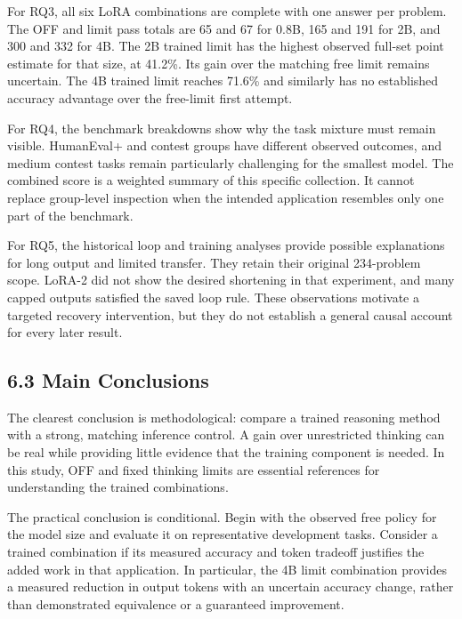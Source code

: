 \documentclass[11pt,letterpaper]{article}
\begin{document}
For RQ3, all six LoRA combinations are complete with one answer per problem. The OFF and limit pass totals are 65 and 67 for 0.8B, 165 and 191 for 2B, and 300 and 332 for 4B. The 2B trained limit has the highest observed full-set point estimate for that size, at 41.2\%. Its gain over the matching free limit remains uncertain. The 4B trained limit reaches 71.6\% and similarly has no established accuracy advantage over the free-limit first attempt.\par

For RQ4, the benchmark breakdowns show why the task mixture must remain visible. HumanEval+ and contest groups have different observed outcomes, and medium contest tasks remain particularly challenging for the smallest model. The combined score is a weighted summary of this specific collection. It cannot replace group-level inspection when the intended application resembles only one part of the benchmark.\par

For RQ5, the historical loop and training analyses provide possible explanations for long output and limited transfer. They retain their original 234-problem scope. LoRA-2 did not show the desired shortening in that experiment, and many capped outputs satisfied the saved loop rule. These observations motivate a targeted recovery intervention, but they do not establish a general causal account for every later result.\par

\subsection*{6.3 Main Conclusions}

The clearest conclusion is methodological: compare a trained reasoning method with a strong, matching inference control. A gain over unrestricted thinking can be real while providing little evidence that the training component is needed. In this study, OFF and fixed thinking limits are essential references for understanding the trained combinations.\par

The practical conclusion is conditional. Begin with the observed free policy for the model size and evaluate it on representative development tasks. Consider a trained combination if its measured accuracy and token tradeoff justifies the added work in that application. In particular, the 4B limit combination provides a measured reduction in output tokens with an uncertain accuracy change, rather than demonstrated equivalence or a guaranteed improvement.\par
\end{document}
